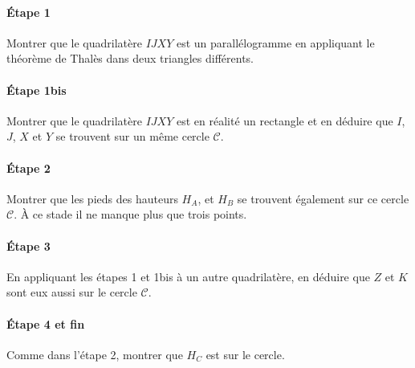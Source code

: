 \begin{exo}
\begin{hint}
\paragraph{Étape 1}
Montrer que le quadrilatère $IJXY$ est un parallélogramme en appliquant le théorème de Thalès dans deux triangles différents.
\begin{center}
\end{center}
\paragraph{Étape 1bis}
Montrer que le quadrilatère $IJXY$ est en réalité un rectangle et en déduire que $I$, $J$, $X$ et $Y$ se trouvent sur un même cercle $\mathcal C$.
\paragraph{Étape 2}
Montrer que les pieds des hauteurs $H_A$, et $H_B$ se trouvent également sur ce cercle $\mathcal C$. À ce stade il ne manque plus que trois points.
\paragraph{Étape 3}
En appliquant les étapes 1 et 1bis à un autre quadrilatère, en déduire que $Z$ et $K$ sont eux aussi sur le cercle $\mathcal C$.
\paragraph{Étape 4 et fin}
Comme dans l'étape 2, montrer que $H_C$ est sur le cercle.
\end{hint}
\end{exo}







\indications
\correction



